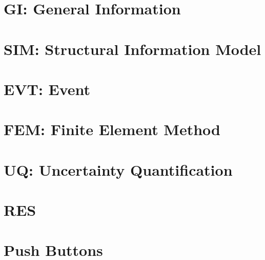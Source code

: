 

\section{GI: General Information}
\label{sec:generalInfo}


\section{SIM: Structural Information Model}
\label{sec:structuralInfo}


\section{EVT: Event}
\label{sec:event}


\section{FEM: Finite Element Method}
\label{sec:fem}


\section{UQ: Uncertainty Quantification}
\label{sec:uq}



\section{RES}
\label{sec:results}


\section{Push Buttons}
\label{sec:push_buttons}

